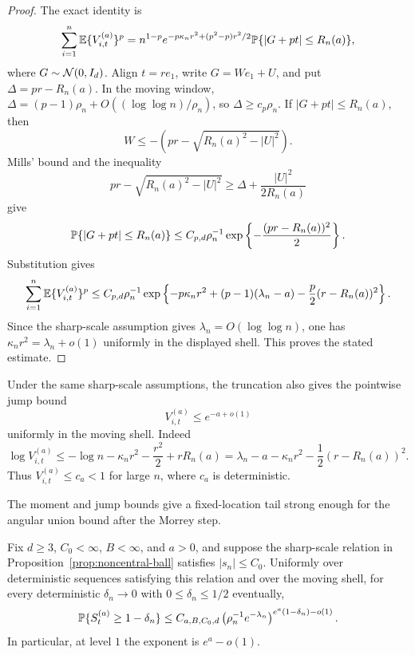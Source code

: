 \begin{proof}
The exact identity is
\[
    \sum_{i=1}^n\mathbb E \{V_{i,t}^{(a)}\}^p
    =
    n^{1-p}
    e^{-p\kappa_nr^2+(p^2-p)r^2/2}
    \mathbb P\{|G+pt|\le R_n(a)\},
    \]
where \(G\sim\mathcal N(0,I_d)\).  Align \(t=re_1\), write \(G=We_1+U\), and put
\(\Delta=pr-R_n(a)\).  In the moving window,
\(\Delta=(p-1)\rho_n+O((\log\log n)/\rho_n)\), so
\(\Delta\ge c_p\rho_n\).  If \(|G+pt|\le R_n(a)\), then
\[
    W\le -\left(pr-\sqrt{R_n(a)^2-|U|^2}\right).
\]
Mills' bound and the inequality
\[
    pr-\sqrt{R_n(a)^2-|U|^2}
    \ge
    \Delta+\frac{|U|^2}{2R_n(a)}
\]
give
\[
    \mathbb P\{|G+pt|\le R_n(a)\}
    \le
    C_{p,d}\rho_n^{-1}
    \exp\left\{-\frac{(pr-R_n(a))^2}{2}\right\}.
\]
Substitution gives
\[
    \sum_{i=1}^n\mathbb E \{V_{i,t}^{(a)}\}^p
    \le
    C_{p,d}\rho_n^{-1}
    \exp\left\{
        -p\kappa_nr^2
        +(p-1)(\lambda_n-a)
        -\frac p2(r-R_n(a))^2
    \right\}.
\]
Since the sharp-scale assumption gives \(\lambda_n=O(\log\log n)\), one has
\(\kappa_nr^2=\lambda_n+o(1)\) uniformly in the displayed shell. This proves
the stated estimate.
\end{proof}

Under the same sharp-scale assumptions, the truncation also gives the
pointwise jump bound
\[
    V_{i,t}^{(a)}\le e^{-a+o(1)}
\]
uniformly in the moving shell.  Indeed
\[
    \log V_{i,t}^{(a)}
    \le
    -\log n-\kappa_nr^2-\frac{r^2}{2}+rR_n(a)
    =
    \lambda_n-a-\kappa_nr^2-\frac12(r-R_n(a))^2.
\]
Thus \(V_{i,t}^{(a)}\le c_a<1\) for large \(n\), where \(c_a\) is deterministic.

The moment and jump bounds give a fixed-location tail strong enough for the
angular union bound after the Morrey step.
\begin{proposition}
\label{prop:fixed-t-bennett}
Fix \(d\ge3\), \(C_0<\infty\), \(B<\infty\), and \(a>0\), and suppose the
sharp-scale relation in Proposition~\ref{prop:noncentral-ball} satisfies
\(|s_n|\le C_0\).  Uniformly over deterministic sequences satisfying this
relation and over the moving shell, for every deterministic
\(\delta_n\to0\) with \(0\le\delta_n\le1/2\) eventually,
\[
    \mathbb P\{S_t^{(a)}\ge1-\delta_n\}
    \le
    C_{a,B,C_0,d}
    \left(\rho_n^{-1}e^{-\lambda_n}\right)^{
        e^a(1-\delta_n)-o(1)} .
\]
In particular, at level \(1\) the exponent is \(e^a-o(1)\).
\end{proposition}

